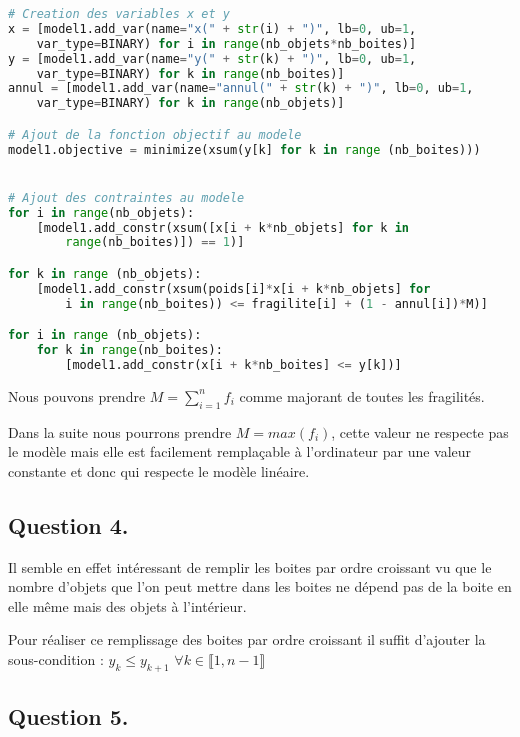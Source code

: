 \begin{lstlisting}[language=Python]
# Creation des variables x et y
x = [model1.add_var(name="x(" + str(i) + ")", lb=0, ub=1, 
    var_type=BINARY) for i in range(nb_objets*nb_boites)]
y = [model1.add_var(name="y(" + str(k) + ")", lb=0, ub=1,   
    var_type=BINARY) for k in range(nb_boites)]
annul = [model1.add_var(name="annul(" + str(k) + ")", lb=0, ub=1, 
    var_type=BINARY) for k in range(nb_objets)]

# Ajout de la fonction objectif au modele
model1.objective = minimize(xsum(y[k] for k in range (nb_boites)))


# Ajout des contraintes au modele
for i in range(nb_objets):
    [model1.add_constr(xsum([x[i + k*nb_objets] for k in 
        range(nb_boites)]) == 1)]

for k in range (nb_objets):
    [model1.add_constr(xsum(poids[i]*x[i + k*nb_objets] for 
        i in range(nb_boites)) <= fragilite[i] + (1 - annul[i])*M)]

for i in range (nb_objets):
    for k in range(nb_boites):
        [model1.add_constr(x[i + k*nb_boites] <= y[k])] 
\end{lstlisting}

Nous pouvons prendre $M = \sum_{i = 1}^{n} f_i$ comme majorant de toutes les fragilités.\vspace{12pt}

Dans la suite nous pourrons prendre $M = max(f_i)$, cette valeur ne respecte pas le modèle mais elle est facilement remplaçable à l'ordinateur par une valeur constante et donc qui respecte le modèle linéaire.\vspace{12pt}

\subsection*{Question 4.}

Il semble en effet intéressant de remplir les boites par ordre croissant vu que le nombre d'objets que l'on peut mettre dans les boites ne dépend pas de la boite en elle même mais des objets à l'intérieur.\vspace{12pt}

Pour réaliser ce remplissage des boites par ordre croissant il suffit d'ajouter la sous-condition :
$y_k \leq y_{k + 1}$ \hspace{12pt}$\forall k \in \llbracket  1, n-1 \rrbracket$

\subsection*{Question 5.}